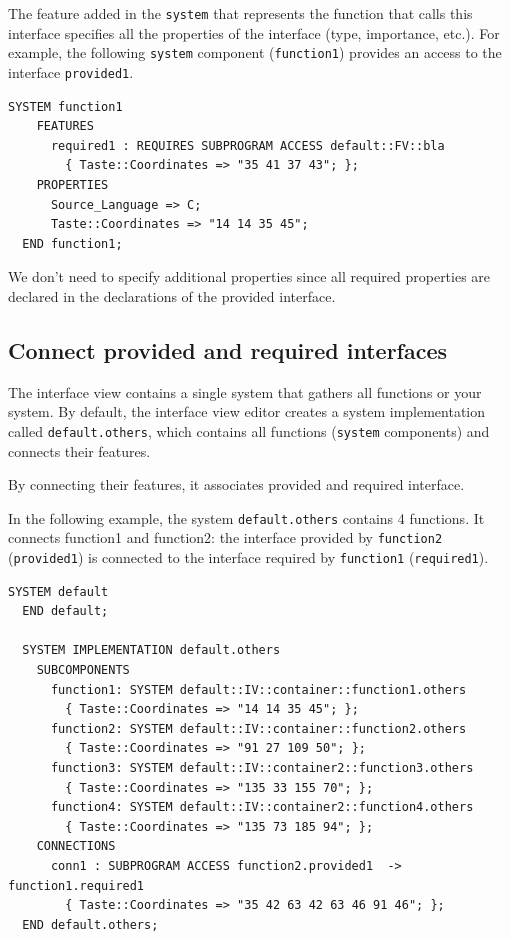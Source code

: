 \documentclass[11pt]{book}
\begin{document}
      The feature added in the \texttt{system} that represents the function
      that calls this interface specifies all the properties of the
      interface (type, importance, etc.). For example, the following
      \texttt{system} component (\texttt{function1}) provides an access to the
      interface \texttt{provided1}. 

      \begin{lstlisting}[language=aadl]
  SYSTEM function1
    FEATURES
      required1 : REQUIRES SUBPROGRAM ACCESS default::FV::bla
        { Taste::Coordinates => "35 41 37 43"; };
    PROPERTIES
      Source_Language => C;
      Taste::Coordinates => "14 14 35 45";
  END function1;
      \end{lstlisting}

      We don't need to specify additional properties since all required
      properties are declared in the declarations of the provided interface. 


      \subsection{Connect provided and required interfaces}
      The interface view contains a single system that gathers all functions or
      your system. By default, the interface view editor creates a system
      implementation called \texttt{default.others}, which contains all
      functions (\texttt{system} components) and connects their features.

      By connecting their features, it associates provided and required
      interface.

      In the following example, the system \texttt{default.others} contains 4
      functions. It connects function1 and function2: the interface provided by
      \texttt{function2} (\texttt{provided1}) is connected to the interface
      required by \texttt{function1} (\texttt{required1}).

      \begin{lstlisting}[language=aadl]
  SYSTEM default
  END default;

  SYSTEM IMPLEMENTATION default.others
    SUBCOMPONENTS
      function1: SYSTEM default::IV::container::function1.others
        { Taste::Coordinates => "14 14 35 45"; };
      function2: SYSTEM default::IV::container::function2.others
        { Taste::Coordinates => "91 27 109 50"; };
      function3: SYSTEM default::IV::container2::function3.others
        { Taste::Coordinates => "135 33 155 70"; };
      function4: SYSTEM default::IV::container2::function4.others
        { Taste::Coordinates => "135 73 185 94"; };
    CONNECTIONS
      conn1 : SUBPROGRAM ACCESS function2.provided1  -> function1.required1 
        { Taste::Coordinates => "35 42 63 42 63 46 91 46"; };
  END default.others;
      \end{lstlisting}
\end{document}
